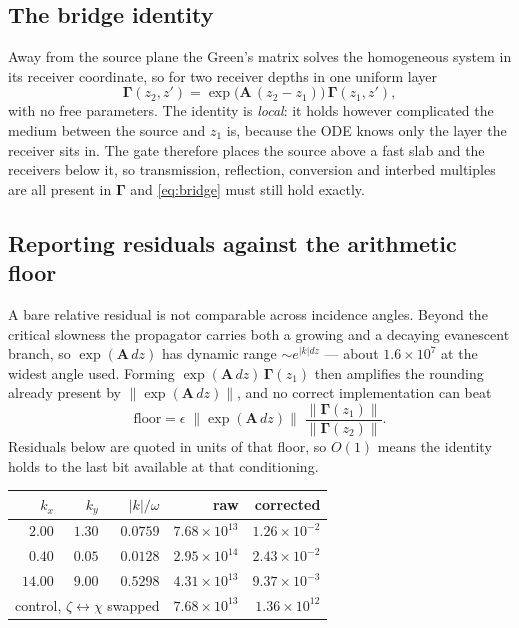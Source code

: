 \documentclass[11pt,a4paper]{article}
\newcommand{\bA}{\mathbf{A}}
\begin{document}
\subsection{The bridge identity}

Away from the source plane the Green's matrix solves the homogeneous system in
its receiver coordinate, so for two receiver depths in one uniform layer
\begin{equation}\label{eq:bridge}
  \boldsymbol\Gamma(z_2,z') = \exp\!\bigl(\bA\,(z_2-z_1)\bigr)\,\boldsymbol\Gamma(z_1,z'),
\end{equation}
with no free parameters.  The identity is \emph{local}: it holds however
complicated the medium between the source and $z_1$ is, because the ODE knows
only the layer the receiver sits in.  The gate therefore places the source above
a fast slab and the receivers below it, so transmission, reflection, conversion
and interbed multiples are all present in $\boldsymbol\Gamma$ and
\eqref{eq:bridge} must still hold exactly.

\subsection{Reporting residuals against the arithmetic floor}

A bare relative residual is not comparable across incidence angles.  Beyond the
critical slowness the propagator carries both a growing and a decaying
evanescent branch, so $\exp(\bA\,dz)$ has dynamic range $\sim e^{|k|dz}$ ---
about $1.6\times10^{7}$ at the widest angle used.  Forming
$\exp(\bA\,dz)\,\boldsymbol\Gamma(z_1)$ then amplifies the rounding already
present by $\|\exp(\bA\,dz)\|$, and no correct implementation can beat
\begin{equation}
  \text{floor} = \epsilon\;\|\exp(\bA\,dz)\|\;
  \frac{\|\boldsymbol\Gamma(z_1)\|}{\|\boldsymbol\Gamma(z_2)\|}.
\end{equation}
Residuals below are quoted in units of that floor, so $O(1)$ means the identity
holds to the last bit available at that conditioning.

\begin{center}
\begin{tabular}{rrrrr}
\toprule
$k_x$ & $k_y$ & $|k|/\omega$ & raw & corrected\\
\midrule
$2.00$  & $1.30$ & $0.0759$ & $7.68\times10^{13}$ & $1.26\times10^{-2}$\\
$0.40$  & $0.05$ & $0.0128$ & $2.95\times10^{14}$ & $2.43\times10^{-2}$\\
$14.00$ & $9.00$ & $0.5298$ & $4.31\times10^{13}$ & $9.37\times10^{-3}$\\
\midrule
\multicolumn{3}{r}{control, $\zeta\leftrightarrow\chi$ swapped} & $7.68\times10^{13}$ & $1.36\times10^{12}$\\
\bottomrule
\end{tabular}
\end{center}
\end{document}

